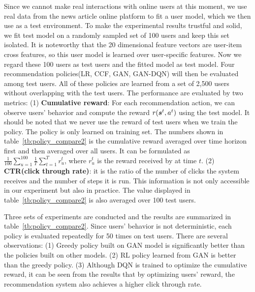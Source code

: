 \documentclass{article} %
\newcommand{\Li}[1]{{\color{cyan}{\bf\sf [Li: #1]}}}
\begin{document}
Since we cannot make real interactions with online users at this moment, we use real data from the news article online platform to fit a user model, which we then use as a test environment. To make the experimental results trustful and solid, we fit test model on a randomly sampled set of 100 users and keep this set isolated. It is noteworthy that the 20 dimensional feature vectors are user-item cross features, so this user model is learned over user-specific features. Now we regard these 100 users as test users and the fitted model as test model. Four recommendation policies(LR, CCF, GAN, GAN-DQN) will then be evaluated among test users. All of these policies are learned from a set of 2,500 users without overlapping with the test users. The performance are evaluated by two metrics: {(1) \bf Cumulative reward}: For each recommendation action, we can observe users' behavior and compute the \Li{\st{her}} reward $r({\bm{s}}^t,a^t)$ using the test model. 
It should be noted that we never use the reward of test users when we train the policy. The policy is only learned on training set. The numbers shown in table~\ref{tb:policy_compare2} is the cumulative reward averaged over time horizon first and then averaged over all users. It can be formulated as $\frac{1}{100}\sum_{u=1}^{100} \frac{1}{T}\sum_{t=1}^T r^t_u$, where $r^t_u$ is the reward received by at time $t$. (2) {\bf CTR(click through rate)}: it is the ratio of the number of clicks the system receives and the number of steps it is run. This information is not only accessible in our experiment but also in practice. The value displayed in table~\ref{tb:policy_compare2} is also averaged over 100 test users.

Three sets of experiments are conducted and the results are summarized in table~\ref{tb:policy_compare2}. Since users' behavior is not deterministic, each policy is evaluated repeatedly for 50 times on test users. There are several observations: (1) Greedy policy built on GAN model is significantly better than the policies built on other models. (2) RL policy learned from GAN is better than the greedy policy. (3) Although DQN is trained to optimize the cumulative reward, it can be seen from the results that by optimizing users' reward, the recommendation system also achieves a higher click through rate.
\end{document}
